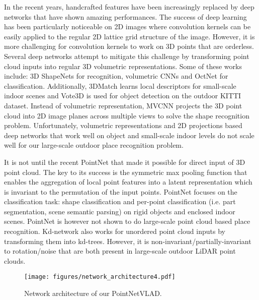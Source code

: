\documentclass[10pt,twocolumn,letterpaper]{article}
\begin{document}
In the recent years, handcrafted features have been increasingly replaced by deep networks that have shown amazing performances. The success of deep learning has been particularly noticeable on 2D images where convolution kernels can be easily applied to the regular 2D lattice grid structure of the image. However, it is more challenging for convolution kernels to work on 3D points that are orderless.
Several deep networks attempt to mitigate this challenge by transforming point cloud inputs into regular 3D volumetric representations. Some of these works include:
3D ShapeNets \cite{Zhirong15CVPR} for recognition, volumetric CNNs \cite{Qi:2016} and OctNet \cite{Riegler2017OctNet} for classification. Additionally, 3DMatch \cite{Zeng:2017} learns local descriptors for small-scale indoor scenes and Vote3D \cite{Wang-RSS-15} is used for object detection on the outdoor KITTI dataset.
Instead of volumetric representation, MVCNN \cite{SuMKL:2015} projects the 3D point cloud into 2D image planes across multiple views to solve the shape recognition problem. 
Unfortunately, volumetric representations and 2D projections based deep networks that work well on object and small-scale indoor levels 
do not scale well for our large-scale outdoor place recognition problem.


It is not until the recent PointNet \cite{qi2016pointnet} that 
made it possible for direct input of 3D point cloud. 
The key to its success is the symmetric max pooling function that enables the aggregation of local point features into a latent representation which is invariant to the permutation of the input points. PointNet focuses on the classification task: shape classification and per-point classification (i.e. part segmentation, scene semantic parsing) on rigid objects and enclosed indoor scenes. PointNet is however not shown to do large-scale point cloud based place recognition. 
Kd-network \cite{Klokov:2017} also works for unordered point cloud inputs by transforming them into kd-trees. However, it is non-invariant/partially-invariant to rotation/noise that are both present in large-scale outdoor LiDAR point clouds. 
\begin{figure*}[t]
	\begin{center}
		\texttt{[image: figures/network\_architecture4.pdf]}
	\end{center}
	\vspace{-0.5cm}
	\caption{Network architecture of our PointNetVLAD.\vspace{-0.4cm}}
	\label{fig:PointNetVLAD}
\end{figure*}
\end{document}

